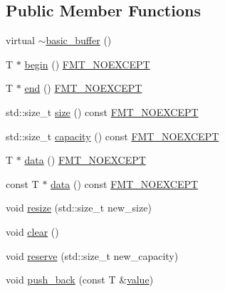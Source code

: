 \subsection*{Public Member Functions}
\begin{DoxyCompactItemize}
\item 
virtual \hyperlink{classinternal_1_1basic__buffer_a3d5daba6aeecf79aeecdd4b7a8aee8ae}{$\sim$basic\+\_\+buffer} ()
\item 
T $\ast$ \hyperlink{classinternal_1_1basic__buffer_ae9d79a4d8c58625f46dfc48e95091bb4}{begin} () \hyperlink{core_8h_aef128913e8400683b1cbd1a3a2e11df3}{F\+M\+T\+\_\+\+N\+O\+E\+X\+C\+E\+PT}
\item 
T $\ast$ \hyperlink{classinternal_1_1basic__buffer_ab9c6b3ee6d7189a86a6a3734c7597621}{end} () \hyperlink{core_8h_aef128913e8400683b1cbd1a3a2e11df3}{F\+M\+T\+\_\+\+N\+O\+E\+X\+C\+E\+PT}
\item 
std\+::size\+\_\+t \hyperlink{classinternal_1_1basic__buffer_abc95713c3873c5820f10105fe7c7af93}{size} () const \hyperlink{core_8h_aef128913e8400683b1cbd1a3a2e11df3}{F\+M\+T\+\_\+\+N\+O\+E\+X\+C\+E\+PT}
\item 
std\+::size\+\_\+t \hyperlink{classinternal_1_1basic__buffer_ae88bfc1cb8c896fa0b689ad8158cccae}{capacity} () const \hyperlink{core_8h_aef128913e8400683b1cbd1a3a2e11df3}{F\+M\+T\+\_\+\+N\+O\+E\+X\+C\+E\+PT}
\item 
T $\ast$ \hyperlink{classinternal_1_1basic__buffer_ab4a96d7d4394f469568d290fde5a75a7}{data} () \hyperlink{core_8h_aef128913e8400683b1cbd1a3a2e11df3}{F\+M\+T\+\_\+\+N\+O\+E\+X\+C\+E\+PT}
\item 
const T $\ast$ \hyperlink{classinternal_1_1basic__buffer_affc95a67bf8b10b2dba4bfd976c9901c}{data} () const \hyperlink{core_8h_aef128913e8400683b1cbd1a3a2e11df3}{F\+M\+T\+\_\+\+N\+O\+E\+X\+C\+E\+PT}
\item 
void \hyperlink{classinternal_1_1basic__buffer_adbd2b147e114f0cc4573f734d4326669}{resize} (std\+::size\+\_\+t new\+\_\+size)
\item 
void \hyperlink{classinternal_1_1basic__buffer_a9a18325765c5245d1861874512355b72}{clear} ()
\item 
void \hyperlink{classinternal_1_1basic__buffer_ab4bbc728c01282567eebc165d545772a}{reserve} (std\+::size\+\_\+t new\+\_\+capacity)
\item 
void \hyperlink{classinternal_1_1basic__buffer_a8dd9de72728ab902c31f22bdba9a7a55}{push\+\_\+back} (const T \&\hyperlink{classinternal_1_1value}{value})
\item 

\end{DoxyCompactItemize}
